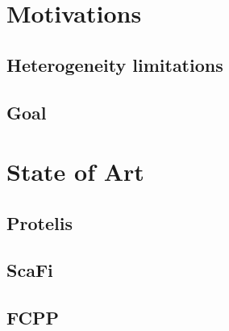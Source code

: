 \section{Motivations}
\label{sec:motivations}

\subsection{Heterogeneity limitations}
\label{subsec:heterogeneity-limitations}

\subsection{Goal}
\label{subsec:goal}


\section{State of Art}
\label{sec:state-of-art}

\subsection{Protelis}
\label{subsec:protelis}

\subsection{ScaFi}
\label{subsec:scafi}

\subsection{FCPP}
\label{subsec:fcpp}


%
%
%
%
%
